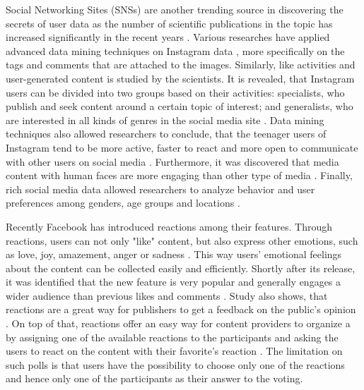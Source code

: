 \documentclass[conference]{IEEEtran}
\begin{document}
Social Networking Sites (SNSs) are another trending source in discovering the secrets of user data as the number of scientific publications in the topic has increased significantly in the recent years \cite{waheed2017investigation}. Various researches have applied advanced data mining techniques on Instagram data \cite{jang2015noreciprocity, bakhshi2014faces, hu2014we, jang2016teensengagemorewithfewerphotos, han2016teensarefrommars}, more specifically on the tags and comments that are attached to the images. Similarly, like activities and user-generated content is studied by the scientists. It is revealed, that Instagram users can be divided into two groups based on their activities: specialists, who publish and seek content around a certain topic of interest; and generalists, who are interested in all kinds of genres in the social media site \cite{jang2015noreciprocity}. Data mining techniques also allowed researchers to conclude, that the teenager users of Instagram tend to be more active, faster to react and more open to communicate with other users on social media \cite{jang2016teensengagemorewithfewerphotos, han2016teensarefrommars}. Furthermore, it was discovered that media content with human faces are more engaging than other type of media \cite{bakhshi2014faces}. Finally, rich social media data allowed researchers to analyze behavior and user preferences among genders, age groups and locations \cite{farseev2015harvestingmultiplesources}.

Recently Facebook has introduced reactions among their features. Through reactions, users can not only "like" content, but also express other emotions, such as love, joy, amazement, anger or sadness \cite{shouldfacebookusereactions, howarenewspublishersreactingonfacebook}. This way users' emotional feelings about the content can be collected easily and efficiently. Shortly after its release, it was identified that the new feature is very popular and generally engages a wider audience than previous likes and comments \cite{shouldfacebookusereactions}. Study also shows, that reactions are a great way for publishers to get a feedback on the public's opinion \cite{howarenewspublishersreactingonfacebook}. On top of that, reactions offer an easy way for content providers to organize a by assigning one of the available reactions to the participants and asking the users to react on the content with their favorite's reaction \cite{shouldfacebookusereactions}. The limitation on such polls is that users have the possibility to choose only one of the reactions and hence only one of the participants as their answer to the voting.  
\end{document}
